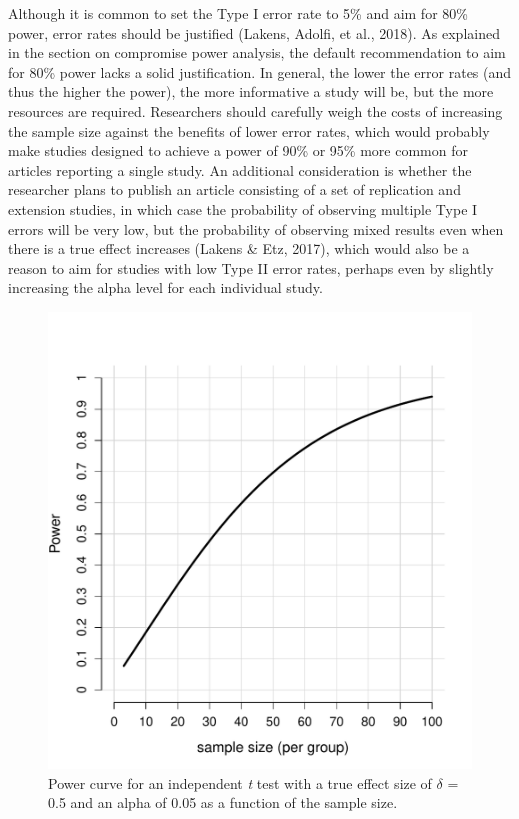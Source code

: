 \documentclass[
  english,
  ,jou, a4paper,floatsintext]{apa6}
\begin{document}
Although it is common to set the Type I error rate to 5\% and aim for 80\% power, error rates should be justified (Lakens, Adolfi, et al., 2018). As explained in the section on compromise power analysis, the default recommendation to aim for 80\% power lacks a solid justification. In general, the lower the error rates (and thus the higher the power), the more informative a study will be, but the more resources are required. Researchers should carefully weigh the costs of increasing the sample size against the benefits of lower error rates, which would probably make studies designed to achieve a power of 90\% or 95\% more common for articles reporting a single study. An additional consideration is whether the researcher plans to publish an article consisting of a set of replication and extension studies, in which case the probability of observing multiple Type I errors will be very low, but the probability of observing mixed results even when there is a true effect increases (Lakens \& Etz, 2017), which would also be a reason to aim for studies with low Type II error rates, perhaps even by slightly increasing the alpha level for each individual study.

\begin{figure}
\centering
\includegraphics{sample_size_justification_files/figure-latex/power-2-1.pdf}
\caption{\label{fig:power-2}Power curve for an independent \emph{t} test with a true effect size of \(\delta\) = 0.5 and an alpha of 0.05 as a function of the sample size.}
\end{figure}
\end{document}
